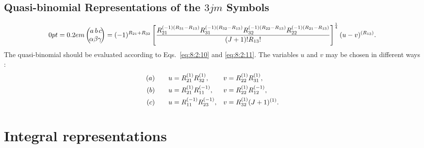\subsection{Quasi-binomial Representations of the $3jm$ Symbols}\label{sec:8.2.7}
\begin{equation}
\threej{a}{b}{c}{\alpha}{\beta}{\gamma}\label{eq:8:2:34}=(-1)^{R_{21}+R_{32}}\left[\frac{R_{21}^{(-1)\left(R_{31}-R_{13}\right)} R_{31}^{(-1)\left(R_{32}-R_{13}\right)} R_{32}^{(-1)\left(R_{22}-R_{13}\right)} R_{22}^{(-1)\left(R_{21}-R_{13}\right)}}{(J+1)!R_{13}!}\right]^{\frac{1}{4}}(u-v)^{\left(R_{13}\right)} .
\end{equation}
The quasi-binomial should be evaluated according to Eqs.~\eqref{eq:8:2:10} and \eqref{eq:8:2:11}. The variables $u$ and $v$ may be chosen in different ways \cite{ref045}:
\begin{align}
(a)& \qquad u=R_{21}^{(1)} R_{32}^{(1)}, && v=R_{22}^{(1)} R_{31}^{(1)},\notag\\
(b)& \qquad u=R_{21}^{(1)} R_{11}^{(-1)}, && v=R_{22}^{(1)} R_{12}^{(-1)},\notag\\
(c)& \qquad u=R_{11}^{(-1)} R_{23}^{(-1)}, && v=R_{32}^{(1)}(J+1)^{(1)}.
\end{align}

\section{Integral representations}\label{sec:8.3}
